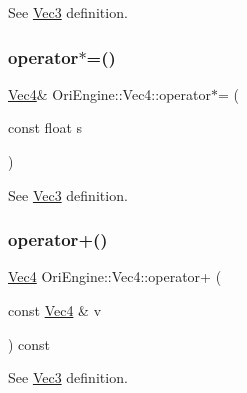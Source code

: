 See \hyperlink{struct_ori_engine_1_1_vec3}{Vec3} definition. 

\hypertarget{struct_ori_engine_1_1_vec4_a104e6844bc375f3a88d8497bc65a4ec3}{}\label{struct_ori_engine_1_1_vec4_a104e6844bc375f3a88d8497bc65a4ec3} 
\subsubsection{\texorpdfstring{operator$\ast$=()}{operator*=()}}
{\footnotesize\ttfamily \hyperlink{struct_ori_engine_1_1_vec4}{Vec4}\& Ori\+Engine\+::\+Vec4\+::operator$\ast$= (\begin{DoxyParamCaption}\item[{const float}]{s }\end{DoxyParamCaption})\hspace{0.3cm}{\ttfamily [inline]}}



See \hyperlink{struct_ori_engine_1_1_vec3}{Vec3} definition. 

\hypertarget{struct_ori_engine_1_1_vec4_a4d734f0ecb0ed6e41646ac9648dc0565}{}\label{struct_ori_engine_1_1_vec4_a4d734f0ecb0ed6e41646ac9648dc0565} 
\subsubsection{\texorpdfstring{operator+()}{operator+()}}
{\footnotesize\ttfamily \hyperlink{struct_ori_engine_1_1_vec4}{Vec4} Ori\+Engine\+::\+Vec4\+::operator+ (\begin{DoxyParamCaption}\item[{const \hyperlink{struct_ori_engine_1_1_vec4}{Vec4} \&}]{v }\end{DoxyParamCaption}) const\hspace{0.3cm}{\ttfamily [inline]}}



See \hyperlink{struct_ori_engine_1_1_vec3}{Vec3} definition. 

\hypertarget{struct_ori_engine_1_1_vec4_a49a96e495f80b4c03df2353ac88654a2}{}\label{struct_ori_engine_1_1_vec4_a49a96e495f80b4c03df2353ac88654a2} 
